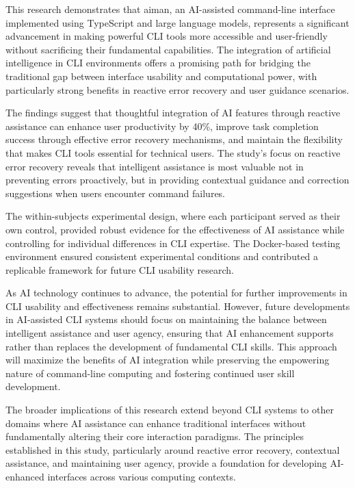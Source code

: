 This research demonstrates that aiman, an AI-assisted command-line interface implemented using TypeScript and large language models, represents a significant advancement in making powerful CLI tools more accessible and user-friendly without sacrificing their fundamental capabilities. The integration of artificial intelligence in CLI environments offers a promising path for bridging the traditional gap between interface usability and computational power, with particularly strong benefits in reactive error recovery and user guidance scenarios.

The findings suggest that thoughtful integration of AI features through reactive assistance can enhance user productivity by 40\%, improve task completion success through effective error recovery mechanisms, and maintain the flexibility that makes CLI tools essential for technical users. The study's focus on reactive error recovery reveals that intelligent assistance is most valuable not in preventing errors proactively, but in providing contextual guidance and correction suggestions when users encounter command failures.

The within-subjects experimental design, where each participant served as their own control, provided robust evidence for the effectiveness of AI assistance while controlling for individual differences in CLI expertise. The Docker-based testing environment ensured consistent experimental conditions and contributed a replicable framework for future CLI usability research.

As AI technology continues to advance, the potential for further improvements in CLI usability and effectiveness remains substantial. However, future developments in AI-assisted CLI systems should focus on maintaining the balance between intelligent assistance and user agency, ensuring that AI enhancement supports rather than replaces the development of fundamental CLI skills. This approach will maximize the benefits of AI integration while preserving the empowering nature of command-line computing and fostering continued user skill development.

The broader implications of this research extend beyond CLI systems to other domains where AI assistance can enhance traditional interfaces without fundamentally altering their core interaction paradigms. The principles established in this study, particularly around reactive error recovery, contextual assistance, and maintaining user agency, provide a foundation for developing AI-enhanced interfaces across various computing contexts.
